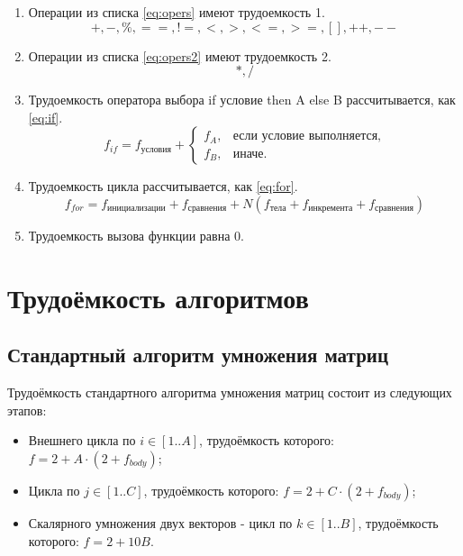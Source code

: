 \begin{enumerate}
    \item Операции из списка \eqref{eq:opers} имеют трудоемкость 1.
    \begin{equation}
        \label{eq:opers}
        +, -, \%, ==, !=, <, >, <=, >=, [], ++, {-}-
    \end{equation}
    \item Операции из списка \eqref{eq:opers2} имеют трудоемкость 2.
    \begin{equation}
        \label{eq:opers2}
        *, /
    \end{equation}
    \item Трудоемкость оператора выбора if условие then A else B рассчитывается, как \eqref{eq:if}.
    \begin{equation}
        \label{eq:if}
        f_{if} = f_{\text{условия}} +
        \begin{cases}
            f_A, & \text{если условие выполняется,}\\
            f_B, & \text{иначе.}
        \end{cases}
    \end{equation}
    \item Трудоемкость цикла рассчитывается, как \eqref{eq:for}.
    \begin{equation}
        \label{eq:for}
        f_{for} = f_{\text{инициализации}} + f_{\text{сравнения}} + N(f_{\text{тела}} + f_{\text{инкремента}} + f_{\text{сравнения}})
    \end{equation}
    \item Трудоемкость вызова функции равна 0.
\end{enumerate}

\section{Трудоёмкость алгоритмов}

\subsection{Стандартный алгоритм умножения матриц}

Трудоёмкость стандартного алгоритма умножения матриц состоит из следующих этапов:
\begin{itemize}
    \item Внешнего цикла по $i \in [1..A]$, трудоёмкость которого: $f = 2 + A \cdot (2 + f_{body})$;
    \item Цикла по $j \in [1..C]$, трудоёмкость которого: $f = 2 + C \cdot (2 + f_{body})$;
    \item Скалярного умножения двух векторов - цикл по $k \in [1..B]$, трудоёмкость которого: $f = 2 + 10B$.
\end{itemize}

